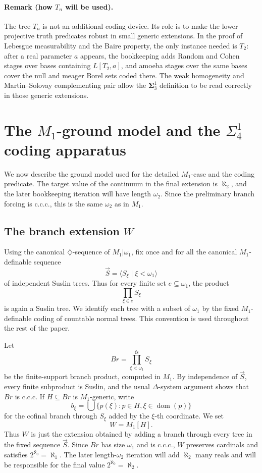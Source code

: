 \documentclass[a4paper,11pt]{article}
\begin{document}
\paragraph{Remark (how $T_n$ will be used).}\label{rem:tn-use-later}
The tree $T_n$ is not an additional coding device.  Its role is to make the
lower projective truth predicates robust in small generic extensions.  In the
proof of Lebesgue measurability and the Baire property, the only instance
needed is $T_2$: after a real parameter $a$ appears, the bookkeeping adds
Random and Cohen stages over bases containing $L[T_2,a]$, and amoeba stages over
the same bases cover the null and meager Borel sets coded there.  The weak
homogeneity and Martin--Solovay complementing pair allow the
$\boldsymbol\Sigma^1_3$ definition to be read correctly in those generic
extensions.

\section{The $M_1$-ground model and the $\Sigma^1_4$ coding apparatus}
\label{sec:M1-large-continuum-coding}

We now describe the ground model used for the detailed $M_1$-case and the coding predicate.  The target value of the continuum in the final extension is $\aleph_2$, and the later bookkeeping iteration will have length $\omega_2$.  Since the preliminary branch forcing is c.c.c., this is the same $\omega_2$ as in $M_1$.

\subsection{The branch extension $W$}

Using the canonical $\diamondsuit$-sequence of $M_1|\omega_1$, fix once and for all the canonical $M_1$-definable sequence
\[
   \vec S=\langle S_\xi\mid \xi<\omega_1\rangle
\]
of independent Suslin trees.  Thus for every finite set $e\subseteq\omega_1$, the product
\[
   \prod_{\xi\in e}S_\xi
\]
is again a Suslin tree.  We identify each tree with a subset of $\omega_1$ by the fixed $M_1$-definable coding of countable normal trees.  This convention is used throughout the rest of the paper.

Let
\[
   Br=\prod_{\xi<\omega_1}^{\mathrm{fs}} S_\xi
\]
be the finite-support branch product, computed in $M_1$.   By independence of $\vec S$, every finite subproduct is
Suslin, and the usual $\Delta$-system argument shows that $Br$ is c.c.c.  If
$H\subseteq Br$ is $M_1$-generic, write
\[
   b_\xi=\bigcup\{p(\xi):p\in H,\xi\in\operatorname{dom}(p)\}
\]
for the cofinal branch through $S_\xi$ added by the $\xi$-th coordinate.  We set
\[
   W=M_1[H].
\]
Thus $W$ is just the extension obtained by adding a branch through every tree in the fixed sequence $\vec S$.  Since $Br$ has size $\omega_1$ and is c.c.c., $W$ preserves cardinals and satisfies $2^{\aleph_0}=\aleph_1$.  The later length-$\omega_2$ iteration will add $\aleph_2$ many reals and will be responsible for the final value $2^{\aleph_0}=\aleph_2$.
\end{document}

